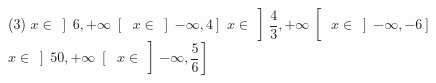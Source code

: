 %
%
    \begin{tasks}(3)
        \task \(x \in \left]6,+\infty\right[\)
        \task \(x \in \left]-\infty,4\right]\)
        \task \(x \in \left]\dfrac{4}{3},+\infty\right[\)
        \task \(x \in \left]-\infty, -6\right]\)
        \task \(x \in \left]50, +\infty\right[\)
        \task \(x \in \left]-\infty, \dfrac{5}{6}\right]\)
    \end{tasks}
